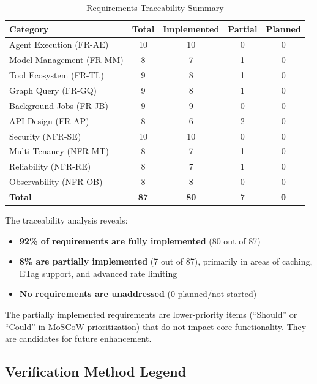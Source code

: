 \begin{table}[htbp]
\centering
\caption{Requirements Traceability Summary}
\label{tab:trace-summary}
\begin{tabular}{|l|c|c|c|c|}
\hline
\textbf{Category} & \textbf{Total} & \textbf{Implemented} & \textbf{Partial} & \textbf{Planned} \\
\hline
Agent Execution (FR-AE) & 10 & 10 & 0 & 0 \\
\hline
Model Management (FR-MM) & 8 & 7 & 1 & 0 \\
\hline
Tool Ecosystem (FR-TL) & 9 & 8 & 1 & 0 \\
\hline
Graph Query (FR-GQ) & 9 & 8 & 1 & 0 \\
\hline
Background Jobs (FR-JB) & 9 & 9 & 0 & 0 \\
\hline
API Design (FR-AP) & 8 & 6 & 2 & 0 \\
\hline
Security (NFR-SE) & 10 & 10 & 0 & 0 \\
\hline
Multi-Tenancy (NFR-MT) & 8 & 7 & 1 & 0 \\
\hline
Reliability (NFR-RE) & 8 & 7 & 1 & 0 \\
\hline
Observability (NFR-OB) & 8 & 8 & 0 & 0 \\
\hline
\textbf{Total} & \textbf{87} & \textbf{80} & \textbf{7} & \textbf{0} \\
\hline
\end{tabular}
\end{table}

The traceability analysis reveals:
\begin{itemize}
    \item \textbf{92\% of requirements are fully implemented} (80 out of 87)
    \item \textbf{8\% are partially implemented} (7 out of 87), primarily in areas of caching, ETag support, and advanced rate limiting
    \item \textbf{No requirements are unaddressed} (0 planned/not started)
\end{itemize}

The partially implemented requirements are lower-priority items (``Should'' or ``Could'' in MoSCoW prioritization) that do not impact core functionality. They are candidates for future enhancement.

\subsection{Verification Method Legend}
\label{subsec:verification-legend}

